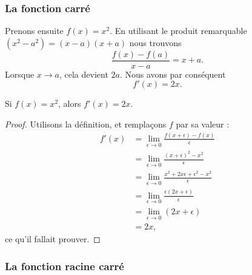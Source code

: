 \subsubsection{La fonction carré}

Prenons ensuite $f(x)=x^2$. En utilisant le produit remarquable $(x^2-a^2)=(x-a)(x+a)$ nous trouvons
\begin{equation}
	\frac{ f(x)-f(a) }{ x-a }=x+a.
\end{equation}
Lorsque $x\to a$, cela devient $2a$. Nous avons par conséquent
\begin{equation}
	f'(x)=2x.
\end{equation}

\begin{lemma}           \label{LemDeccCarr}
    Si $f(x)=x^2$, alors $f'(x)=2x$.
\end{lemma}

\begin{proof}
    Utilisons la définition, et remplaçons $f$ par sa valeur :
    \begin{subequations}
        \begin{align}
            f'(x)   &=\lim_{\epsilon\to 0}\frac{ f(x+\epsilon)-f(x) }{ \epsilon }\\
                &=\lim_{\epsilon\to 0}\frac{ (x+\epsilon)^2-x^2 }{ \epsilon }\\
                &=\lim_{\epsilon\to 0}\frac{ x^2+2x\epsilon+\epsilon^2-x^2 }{ \epsilon }\\
                &=\lim_{\epsilon\to 0}\frac{\epsilon(2x+\epsilon)}{ \epsilon }\\
                &=\lim_{\epsilon\to 0}(2x+\epsilon)\\
                &=2x,
        \end{align}
    \end{subequations}
    ce qu'il fallait prouver.
\end{proof}


\subsubsection{La fonction racine carré}

